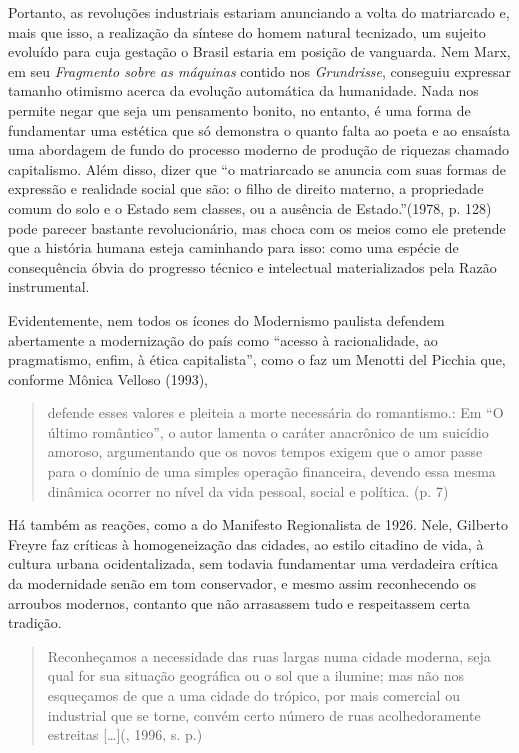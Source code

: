Portanto, as revoluções industriais estariam anunciando a volta do
matriarcado e, mais que isso, a realização da síntese do homem natural
tecnizado, um sujeito evoluído para cuja gestação o Brasil estaria em
posição de vanguarda. Nem Marx, em seu \emph{Fragmento sobre as
máquinas} contido nos \emph{Grundrisse}, conseguiu expressar tamanho
otimismo acerca da evolução automática da humanidade. Nada nos permite
negar que seja um pensamento bonito, no entanto, é uma forma de
fundamentar uma estética que só demonstra o quanto falta ao poeta e ao
ensaísta uma abordagem de fundo do processo moderno de produção de
riquezas chamado capitalismo. Além disso, dizer que ``o matriarcado se
anuncia com suas formas de expressão e realidade social que são: o filho
de direito materno, a propriedade comum do solo e o Estado sem classes,
ou a ausência de Estado.''(1978, p. 128) pode parecer bastante
revolucionário, mas choca com os meios como ele pretende que a história
humana esteja caminhando para isso: como uma espécie de consequência
óbvia do progresso técnico e intelectual materializados pela Razão
instrumental.

Evidentemente, nem todos os ícones do Modernismo paulista defendem
abertamente a modernização do país como ``acesso à racionalidade, ao
pragmatismo, enfim, à ética capitalista'', como o faz um Menotti del
Picchia que, conforme Mônica Velloso (1993),

\begin{quote}
defende esses valores e pleiteia a morte necessária do romantismo.: Em
``O último romântico'', o autor lamenta o caráter anacrônico de um
suicídio amoroso, argumentando que os novos tempos exigem que o amor
passe para o domínio de uma simples operação financeira, devendo essa
mesma dinâmica ocorrer no nível da vida pessoal, social e política. (p.
7)
\end{quote}

Há também as reações, como a do Manifesto Regionalista de 1926. Nele,
Gilberto Freyre faz críticas à homogeneização das cidades, ao estilo
citadino de vida, à cultura urbana ocidentalizada, sem todavia
fundamentar uma verdadeira crítica da modernidade senão em tom
conservador, e mesmo assim reconhecendo os arroubos modernos, contanto
que não arrasassem tudo e respeitassem certa tradição.

\begin{quote}
Reconheçamos a necessidade das ruas largas numa cidade moderna, seja
qual for sua situação geográfica ou o sol que a ilumine; mas não nos
esqueçamos de que a uma cidade do trópico, por mais comercial ou
industrial que se torne, convém certo número de ruas acolhedoramente
estreitas [\ldots{}](, 1996, s. p.)
\end{quote}

